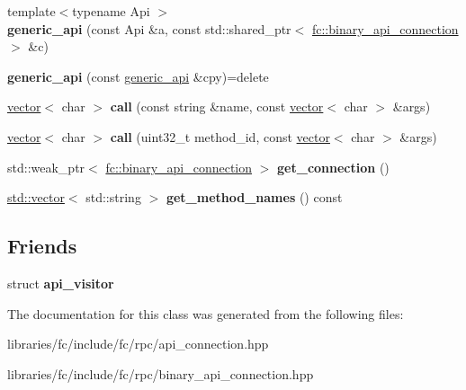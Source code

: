 \begin{DoxyCompactItemize}
\item 
\mbox{\label{classfc_1_1generic__api_ac4cff03375ef11229e2cef431c9c7ccc}} 
{\footnotesize template$<$typename Api $>$ }\\{\bfseries generic\+\_\+api} (const Api \&a, const std\+::shared\+\_\+ptr$<$ \mbox{\hyperlink{classfc_1_1binary__api__connection}{fc\+::binary\+\_\+api\+\_\+connection}} $>$ \&c)
\item 
\mbox{\label{classfc_1_1generic__api_a365a087172afae4eaeb824549461f776}} 
{\bfseries generic\+\_\+api} (const \mbox{\hyperlink{classfc_1_1generic__api}{generic\+\_\+api}} \&cpy)=delete
\item 
\mbox{\label{classfc_1_1generic__api_ad38c8868ef911e0f8aaaa4a8366f6f39}} 
\mbox{\hyperlink{classstd_1_1vector}{vector}}$<$ char $>$ {\bfseries call} (const string \&name, const \mbox{\hyperlink{classstd_1_1vector}{vector}}$<$ char $>$ \&args)
\item 
\mbox{\label{classfc_1_1generic__api_aac5f02f43c1ba508f0edde4820daf0a6}} 
\mbox{\hyperlink{classstd_1_1vector}{vector}}$<$ char $>$ {\bfseries call} (uint32\+\_\+t method\+\_\+id, const \mbox{\hyperlink{classstd_1_1vector}{vector}}$<$ char $>$ \&args)
\item 
\mbox{\label{classfc_1_1generic__api_ae721b7b5cbd7dd46d4f8afc337b4d68d}} 
std\+::weak\+\_\+ptr$<$ \mbox{\hyperlink{classfc_1_1binary__api__connection}{fc\+::binary\+\_\+api\+\_\+connection}} $>$ {\bfseries get\+\_\+connection} ()
\item 
\mbox{\label{classfc_1_1generic__api_acc07b1c516bf195c219d416d03a1307a}} 
\mbox{\hyperlink{classstd_1_1vector}{std\+::vector}}$<$ std\+::string $>$ {\bfseries get\+\_\+method\+\_\+names} () const
\end{DoxyCompactItemize}
\subsection*{Friends}
\begin{DoxyCompactItemize}
\item 
\mbox{\label{classfc_1_1generic__api_aa4ac8018a5ffe79e1e85ea95c396fa53}} 
struct {\bfseries api\+\_\+visitor}
\end{DoxyCompactItemize}


The documentation for this class was generated from the following files\+:\begin{DoxyCompactItemize}
\item 
libraries/fc/include/fc/rpc/api\+\_\+connection.\+hpp\item 
libraries/fc/include/fc/rpc/binary\+\_\+api\+\_\+connection.\+hpp\end{DoxyCompactItemize}
